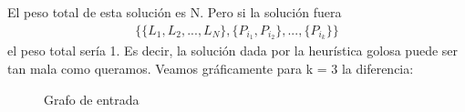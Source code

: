 El peso total de esta solución es N.
Pero si la solución fuera
\begin{align*}
\{ \{L_1, L_2, ..., L_N\}, \{P_{i_1}, P_{i_2}\}, ..., \{P_{i_k}\} \}
\end{align*}
el peso total sería 1. Es decir, la solución dada por la heurística golosa puede ser tan mala como queramos. Veamos gráficamente para k = 3 la diferencia:
\begin{figure}[H]
	\begin{minipage}[t]{\linewidth}
		\centering
		\caption{Grafo de entrada}
		\label{fig:ej3_rotura_entrada}
	\end{minipage}
\end{figure}

